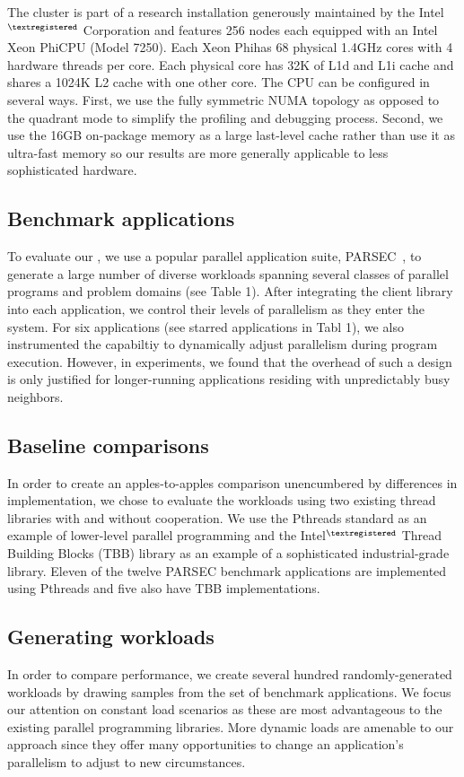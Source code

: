 The cluster is part of a research installation generously maintained by the Intel$^{\tiny{\textregistered}}$ Corporation and features 256 nodes each equipped with an Intel Xeon Phi\texttrademark CPU (Model 7250). Each Xeon Phi\texttrademark has 68 physical 1.4GHz cores with 4 hardware threads per core. Each physical core has 32K of L1d and L1i cache and shares a 1024K L2 cache with one other core. The CPU can be configured in several ways. First, we use the fully symmetric NUMA topology as opposed to the quadrant mode to simplify the profiling and debugging process. Second, we use the 16GB on-package memory as a large last-level cache rather than use it as ultra-fast memory so our results are more generally applicable to less sophisticated hardware.

\subsection{Benchmark applications}
To evaluate our \mech{}, we use a popular parallel application suite, PARSEC~\cite{bienia2008parsec}, to generate a large number of diverse workloads spanning several classes of parallel programs and problem domains (see Table 1). After integrating the client library into each application, we control their levels of parallelism as they enter the system. For six applications (see starred applications in Tabl 1), we also instrumented the capabiltiy to dynamically adjust parallelism during program execution. However, in experiments, we found that the overhead of such a design is only justified for longer-running applications residing with unpredictably busy neighbors.

\subsection{Baseline comparisons}
In order to create an apples-to-apples comparison unencumbered by differences in implementation, we chose to evaluate the workloads using two existing thread libraries with and without cooperation. We use the Pthreads standard as an example of lower-level parallel programming and the Intel$^{\tiny{\textregistered}}$ Thread Building Blocks (TBB) library as an example of a sophisticated industrial-grade library. Eleven of the twelve PARSEC benchmark applications are implemented using Pthreads and five also have TBB implementations.

\subsection{Generating workloads}
In order to compare performance, we create several hundred randomly-generated workloads by drawing samples from the set of benchmark applications. We focus our attention on constant load scenarios as these are most advantageous to the existing parallel programming libraries. More dynamic loads are amenable to our approach since they offer many opportunities to change an application's parallelism to adjust to new circumstances.

